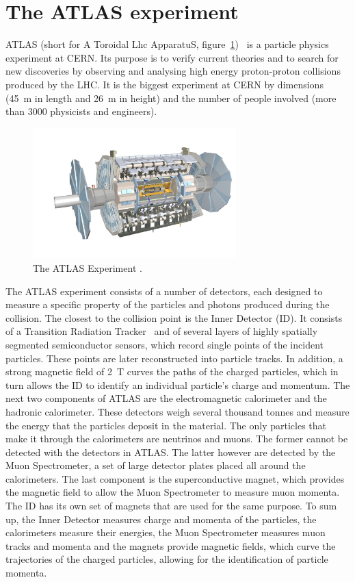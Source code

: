 \section{The ATLAS experiment}
ATLAS (short for A Toroidal Lhc ApparatuS, figure~\ref{fig:atlas})~\cite{Jenni:1193085} is a particle physics experiment at CERN. Its purpose is to verify current theories and to search for new discoveries by observing and analysing high energy proton-proton collisions produced by the LHC. It is the biggest experiment at CERN by dimensions (45~m in length and 26~m in height) and the number of people involved (more than 3000 physicists and engineers).
\begin{figure}[!t]
\centering
\includegraphics[width=0.7\textwidth]{01_introduction/pics/atlas3}
\caption{The ATLAS Experiment \cite{Pequenao:1095924}.}
\label{fig:atlas}
\end{figure}
The ATLAS experiment consists of a number of detectors, each designed to measure a specific property of the particles and photons produced during the collision. The closest to the collision point is the Inner Detector (ID). It consists of a Transition Radiation Tracker~\cite{Danielsson:2194938} and of several layers of highly spatially segmented semiconductor sensors, which record single points of the incident particles. These points are later reconstructed into particle tracks. In addition, a strong magnetic field of 2~T curves the paths of the charged particles, which in turn allows the ID to identify an individual particle's charge and momentum. The next two components of ATLAS are the electromagnetic calorimeter and the hadronic calorimeter. These detectors weigh several thousand tonnes and measure the energy that the particles deposit in the material. The only particles that make it through the calorimeters are neutrinos and muons. The former cannot be detected with the detectors in ATLAS. The latter however are detected by the Muon Spectrometer, a set of large detector plates placed all around the calorimeters. The last component is the superconductive magnet, which provides the magnetic field to allow the Muon Spectrometer to measure muon momenta. The ID has its own set of magnets that are used for the same purpose. To sum up, the Inner Detector measures charge and momenta of the particles, the calorimeters measure their energies, the Muon Spectrometer measures muon tracks and momenta and the magnets provide magnetic fields, which curve the trajectories of the charged particles, allowing for the identification of particle momenta.

